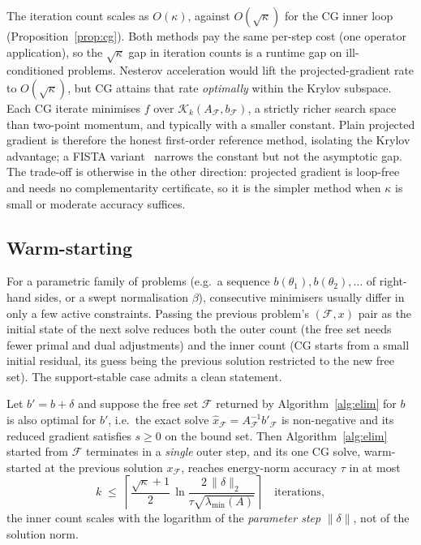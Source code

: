 The iteration count scales as $O(\kappa)$, against $O(\sqrt\kappa)$ for the CG inner loop
(Proposition~\ref{prop:cg}). Both methods pay the same per-step cost (one operator
application), so the $\sqrt\kappa$ gap in iteration counts is a runtime gap on
ill-conditioned problems. Nesterov acceleration would lift the projected-gradient rate to
$O(\sqrt\kappa)$, but CG attains that rate \emph{optimally} within the Krylov subspace. Each
CG iterate minimises $f$ over $\mathcal{K}_k(A_{\mathcal{F}}, b_{\mathcal{F}})$, a strictly
richer search space than two-point momentum, and typically with a smaller constant. Plain
projected
gradient is therefore the honest first-order reference method, isolating the Krylov advantage; a
FISTA variant~\cite{beck2009} narrows the constant but not the asymptotic gap. The trade-off
is otherwise in the other direction: projected gradient is loop-free and needs no
complementarity certificate, so it is the simpler method when $\kappa$ is small or moderate
accuracy suffices.

\subsection{Warm-starting}\label{ssec:warm}

For a parametric family of problems (e.g.\ a sequence $b(\theta_1), b(\theta_2), \dots$ of
right-hand sides, or a swept normalisation $\beta$), consecutive minimisers usually differ in
only a few active constraints. Passing the previous problem's $(\mathcal{F}, x)$ pair as the
initial state of the next solve reduces both the outer count (the free set needs fewer primal
and dual adjustments) and the inner count (CG starts from a small initial residual, its guess
being the previous solution restricted to the new free set). The support-stable case admits a
clean statement.

\begin{proposition}\label{prop:warm}
Let $b' = b + \delta$ and suppose the free set $\mathcal{F}$ returned by
Algorithm~\ref{alg:elim} for $b$ is also optimal for $b'$, i.e.\ the exact solve
$\hat x_{\mathcal{F}} = A_{\mathcal{F}}^{-1} b'_{\mathcal{F}}$ is non-negative and its reduced
gradient satisfies $s \geq 0$ on the bound set. Then Algorithm~\ref{alg:elim} started from
$\mathcal{F}$ terminates in a \emph{single} outer step, and its one CG solve, warm-started at
the previous solution $x_{\mathcal{F}}$, reaches energy-norm accuracy $\tau$ in at most
\[
  k \;\leq\; \left\lceil \frac{\sqrt{\kappa}+1}{2}\,
  \ln\!\frac{2\,\lVert \delta \rVert_2}{\tau\sqrt{\lambda_{\min}(A)}} \right\rceil
  \quad\text{iterations},
\]
the inner count scales with the logarithm of the \emph{parameter step} $\lVert\delta\rVert$,
not of the solution norm.
\end{proposition}

